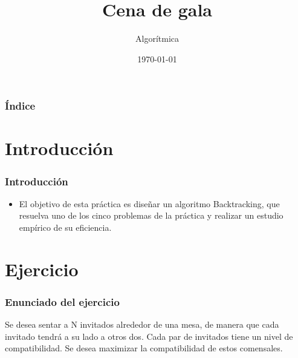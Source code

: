 \documentclass{beamer}
\title[Práctica 4]{Cena de gala} %
\author{Algorítmica} %
\institute[UGR] %
{
Universidad de Granada \\ %
\medskip

}
\date{\today} %
\begin{document}
\begin{frame}
\titlepage %
\end{frame}

\begin{frame}
\frametitle{Índice} %
\tableofcontents %
\end{frame}


\section{Introducción }
\begin{frame}
	\frametitle{Introducción}
	\begin{itemize}
		\item El objetivo de esta práctica es diseñar un algoritmo Backtracking, que resuelva uno de los cinco problemas de la práctica y realizar un estudio empírico de su eficiencia.
	\end{itemize}
\end{frame}


\section{Ejercicio} 
\begin{frame}
	\frametitle{Enunciado del ejercicio}
	Se desea sentar a N invitados alrededor de una mesa, de manera que cada invitado tendrá a su lado a otros dos. Cada par de invitados tiene un nivel de compatibilidad. Se desea maximizar la compatibilidad de estos comensales.
	
\end{frame}

\end{document}
